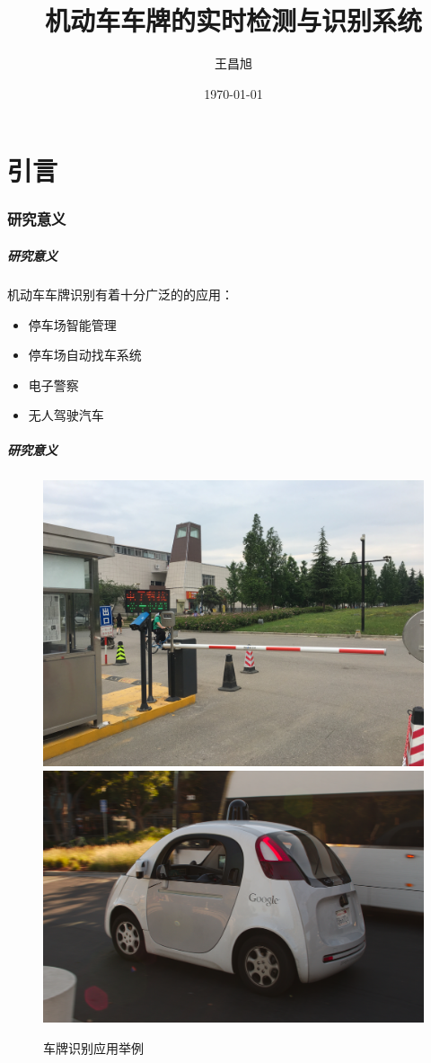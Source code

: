 \documentclass[UTF8]{beamer}
\title{机动车车牌的实时检测与识别系统}
\author[王昌旭]{王昌旭}
\institute[西安电子科技大学\\计算机学院]{西安电子科技大学计算机学院2012级本科生}
\date{\today}
\begin{document}
{ \xdbg
\begin{frame}
  \titlepage
\end{frame}
}

\part{引言}

\section{研究意义}
\begin{frame}
  \frametitle{研究意义}
  机动车车牌识别有着十分广泛的的应用：

  \begin{itemize}
    \item 停车场智能管理
    \item 停车场自动找车系统
    \item 电子警察
    \item 无人驾驶汽车
  \end{itemize} 
\end{frame}

\begin{frame}
  \frametitle{研究意义}
  \begin{figure}[ht]
    \centering
    {\includegraphics[width=0.45\linewidth]{./Figure/ParkingSystem.jpg}}
    {\includegraphics[width=0.45\linewidth]{./Figure/GoogleSelfDrivingCar.jpg}}
    \caption{车牌识别应用举例}
  \end{figure}
\end{frame}
\end{document}
